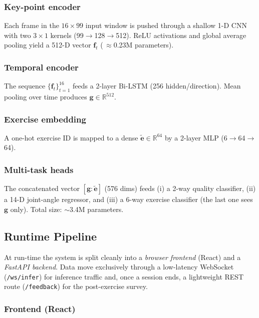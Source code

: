 \documentclass{article}
\begin{document}
\subsubsection{Key-point encoder}
Each frame in the $16\times99$ input window is pushed through a shallow 1-D CNN with two $3{\times}1$ kernels (99$\!\rightarrow$128$\!\rightarrow$512). ReLU activations and global average pooling yield a 512-D vector
$\mathbf f_t$ (\,$\approx$0.23M parameters).

\subsubsection{Temporal encoder}
The sequence $\{\mathbf f_t\}_{t=1}^{16}$ feeds a 2-layer Bi-LSTM (256 hidden/direction).  Mean pooling over time produces
$\mathbf g\!\in\!\mathbb{R}^{512}$.

\subsubsection{Exercise embedding}
A one-hot exercise ID is mapped to a dense $\tilde{\mathbf e}\!\in\!\mathbb{R}^{64}$ by a 2-layer MLP
(6$\!\to$64$\!\to$64).

\subsubsection{Multi-task heads}
The concatenated vector
$[\mathbf g : \tilde{\mathbf e}]$ (576 dims) feeds  
(i) a 2-way quality classifier,  
(ii) a 14-D joint-angle regressor, and  
(iii) a 6-way exercise classifier (the last one sees $\mathbf g$ only).  
Total size: $\sim$3.4M parameters.
\subsection{Runtime Pipeline}
\label{ssec:pipeline}

At run-time the system is split cleanly into a \emph{browser
frontend} (React) and a \emph{FastAPI backend}.  
Data move exclusively through a low-latency WebSocket
(\verb|/ws/infer|) for inference traffic and, once a session ends, a
lightweight REST route (\verb|/feedback|) for the post-exercise survey.

\subsubsection{Frontend (React)}
\label{ssec:frontend}
\end{document}
